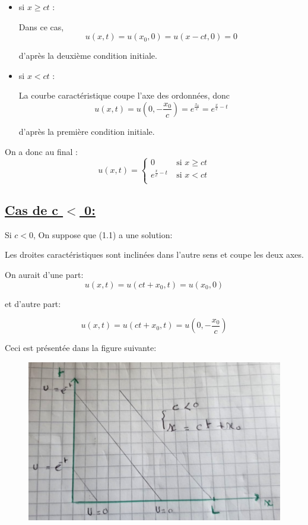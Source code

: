 \begin{itemize}
\item si $x \geq ct$ : 

Dans ce cas,  $$u(x,t) = u(x_0,0) = u(x - ct,0) = 0$$

d'apr\`es la deuxi\`eme condition initiale.

\item si $x < ct$ :

La courbe caract\'eristique coupe l'axe des ordonn\'ees, donc $$u(x,t) = u\left(0,-\frac{x_0}{c}\right) = e^{\frac{x_0}{c}} = e^{\frac{x}{c} - t}$$ 

d'après la première condition initiale.
\end{itemize}

On a donc au final : \begin{equation}
\label{solution}
u(x,t)=
\left \lbrace \begin{array}{rl}
0 & ~\text{si }  x\geq ct\\
e^{\frac{x}{c}-t} & ~\text{si }  x<ct\\
\end{array}\right.
\end{equation}


\subsection[Cas de c $<$ 0]{\uline{Cas de c $<$ 0:}}

Si $c<0$, On suppose que (1.1) a une solution:

Les droites caract\'eristiques sont inclin\'ees dans l'autre sens et coupe les deux axes. 

On aurait d'une part:
$$u(x,t) =u(ct+x_0, t) = u(x_0, 0) $$

et d'autre part:

$$u(x,t) = u(ct+x_0, t)= u\left(0, -\frac{x_0}{c}\right) $$

Ceci est pr\'esent\'ee dans la figure suivante:

\begin{figure}[h!]
	\centering \includegraphics[scale=0.25]{Images_Fichiers/Y4.jpg}
\end{figure}

